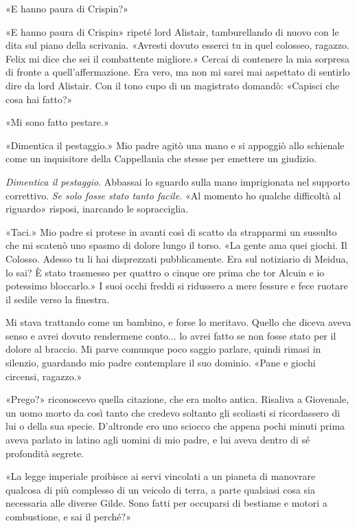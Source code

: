 «E hanno paura di Crispin?»

«E hanno paura di Crispin» ripeté lord Alistair, tamburellando di nuovo
con le dita sul piano della scrivania. «Avresti dovuto esserci tu in
quel colosseo, ragazzo. Felix mi dice che sei il combattente migliore.»
Cercai di contenere la mia sorpresa di fronte a quell'affermazione. Era
vero, ma non mi sarei mai aspettato di sentirlo dire da lord Alistair.
Con il tono cupo di un magistrato domandò: «Capisci che cosa hai fatto?»

«Mi sono fatto pestare.»

«Dimentica il pestaggio.» Mio padre agitò una mano e si appoggiò allo
schienale come un inquisitore della Cappellania che stesse per emettere
un giudizio.

\emph{Dimentica il pestaggio}. Abbassai lo sguardo sulla mano
imprigionata nel supporto correttivo. \emph{Se solo fosse stato tanto
	facile.} «Al momento ho qualche difficoltà al riguardo» risposi,
inarcando le sopracciglia.

«Taci.» Mio padre si protese in avanti così di scatto da strapparmi un
sussulto che mi scatenò uno spasmo di dolore lungo il torso. «La gente
ama quei giochi. Il Colosso. Adesso tu li hai disprezzati pubblicamente.
Era sul notiziario di Meidua, lo sai? È stato trasmesso per quattro o
cinque ore prima che tor Alcuin e io potessimo bloccarlo.» I suoi occhi
freddi si ridussero a mere fessure e fece ruotare il sedile verso la
finestra.

Mi stava trattando come un bambino, e forse lo meritavo. Quello che
diceva aveva senso e avrei dovuto rendermene conto... lo avrei fatto se
non fosse stato per il dolore al braccio. Mi parve comunque poco saggio
parlare, quindi rimasi in silenzio, guardando mio padre contemplare il
suo dominio. «Pane e giochi circensi, ragazzo.»

«Prego?» riconoscevo quella citazione, che era molto antica. Risaliva a
Giovenale, un uomo morto da così tanto che credevo soltanto gli
scoliasti si ricordassero di lui o della sua specie. D'altronde ero uno
sciocco che appena pochi minuti prima aveva parlato in latino agli
uomini di mio padre, e lui aveva dentro di sé profondità segrete.

«La legge imperiale proibisce ai servi vincolati a un pianeta di
manovrare qualcosa di più complesso di un veicolo di terra, a parte
qualsiasi cosa sia necessaria alle diverse Gilde. Sono fatti per
occuparsi di bestiame e motori a combustione, e sai il perché?»


